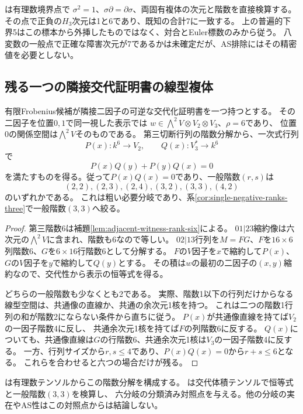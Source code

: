 \begin{remark}[検算と未確定の精密値]
は有理数境界点で
$\sigma^2=1$、$\sigma\partial=\partial\sigma$、両固有複体の次元と階数を直接検算する。
その点で正負の$H_3$次元は1と6であり、既知の合計7に一致する。
上の普遍的下界5はこの標本から外挿したものではなく、対合とEuler標数のみから従う。
八変数の一般点で正確な障害次元が7であるかは未確定だが、AS排除にはその精密値を必要としない。
\end{remark}

\subsection{残る一つの隣接交代証明書の線型複体}
\begin{proposition}\label{prop:single-negative-linear-complex}
有限Frobenius候補が隣接二因子の可逆な交代化証明書を一つ持つとする。
その二因子を位置$0,1$で同一視した表示では
$w\in\bigwedge^2 V\otimes V_2\otimes V_3$、$\rho=6$であり、
位置0の関係空間は$\bigwedge^2 V$そのものである。
第三切断行列の階数分解から、一次式行列
\[
 P(x):k^6\longrightarrow V_2,\qquad Q(x):V_3^*\longrightarrow k^6
\]
で
\[
 P(x)Q(y)+P(y)Q(x)=0
\]
を満たすものを得る。従って$P(x)Q(x)=0$であり、一般階数$(r,s)$は
\[
 (2,2),(2,3),(2,4),(3,2),(3,3),(4,2)
\]
のいずれかである。
これは粗い必要分岐であり、系\ref{cor:single-negative-ranks-three}で一般階数$(3,3)$へ絞る。
\end{proposition}
\begin{proof}
第三階数6は補題\ref{lem:adjacent-witness-rank-six}による。
$01|23$縮約像は六次元の$\bigwedge^2V$に含まれ、階数も6なので等しい。
$02|13$行列を$M=FG$、$F$を$16\times6$列階数6、$G$を$6\times16$行階数6として分解する。
$F$の$V$因子を$x$で縮約して$P(x)$、$G$の$V$因子を$y$で縮約して$Q(y)$とする。
その積は$w$の最初の二因子の$(x,y)$縮約なので、交代性から表示の恒等式を得る。

どちらの一般階数も少なくとも2である。
実際、階数1以下の行列だけからなる線型空間は、共通像の直線か、共通の余次元1核を持つ。
これは二つの階数1行列の和が階数2にならない条件から直ちに従う。
$P(x)$が共通像直線を持てば$V_2$の一因子階数4に反し、
共通余次元1核を持てば$F$の列階数6に反する。
$Q(x)$についても、共通像直線は$G$の行階数6、共通余次元1核は$V_3$の一因子階数4に反する。
一方、行列サイズから$r,s\leq4$であり、$P(x)Q(x)=0$から$r+s\leq6$となる。
これらを合わせると六つの場合だけが残る。
\end{proof}

は有理数テンソルからこの階数分解を構成する。
は交代体積テンソルで恒等式と一般階数$(3,3)$を検算し、
六分岐の分類済み対照点を与える。他の分岐の実在やAS性はこの対照点からは結論しない。

